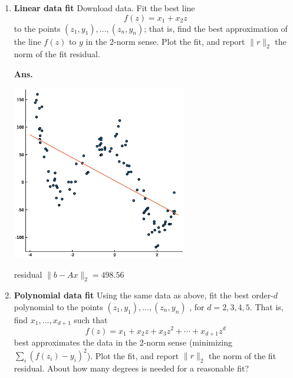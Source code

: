 \documentclass{article}
\newcommand{\showsolution}[1]{\textbf{Ans.}\;#1}
\newcommand{\red}[1]{{\color{red}#1}}
\begin{document}
\begin{enumerate}
\begin{enumerate}
		\showsolution{
			\[
			x_n = b_n/R_{nn}, \quad x_{i} = \frac{b_{i} - \sum_{k=i+1}^n R_{i,k}x_k}{R_{i,i}}.
			\]	
		}
	\end{enumerate}

\item \textbf{Linear data fit} Download \red{data}. Fit the best line 
\[
f(z) = x_1 + x_2z 
\]
to the points $(z_1,y_1),...,(z_n,y_n)$; that is, find the best approximation of the line $f(z)$ to $y$ in the 2-norm sense.
Plot the fit, and report $\|r\|_2$ the norm of the fit residual.

\showsolution{
\begin{center}
	\includegraphics[width=3in]{img/hw1_p2_o1.eps}
\end{center}
residual $\|b-Ax\|_2 = 498.56$
}

\item \textbf{Polynomial data fit}  Using the same data as above, fit the best order-$d$ polynomial to the points $(z_1,y_1),...,(z_n,y_n)$ , for $d = 2,3,4,5$. That is, find $x_1,...,x_{d+1}$ such that 
\[
f(z) = x_1 + x_2z + x_3z^2 + \cdots + x_{d+1}z^d
\]
best approximates the data in the 2-norm sense (minimizing $\sum_i (f(z_i)-y_i)^2$).
Plot the fit, and report $\|r\|_2$ the norm of the fit residual. About how many degrees is needed for a reasonable fit?


\end{enumerate}
\end{document}
